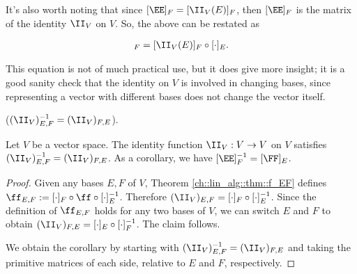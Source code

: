 \begin{theorem}
    It's also worth noting that since $[\EE]_F = [\II_V(E)]_F$, then $[\EE]_F$ is the matrix of the identity $\II_V$ on $V$. So, the above can be restated as
    
    \begin{align*}
        [\cdot]_F = [\II_V(E)]_F \circ [\cdot]_E.
    \end{align*}
    
    This equation is not of much practical use, but it does give more insight; it is a good sanity check that the identity on $V$ is involved in changing bases, since representing a vector with different bases does not change the vector itself.
\end{theorem}

\begin{theorem}
\label{ch::lin_alg::thm::I_EF}
    ($(\II_V)_{E,F}^{-1} = (\II_V)_{F,E}$).
    
    Let $V$ be a vector space. The identity function $\II_V:V \rightarrow V$ on $V$ satisfies $(\II_V)_{E,F}^{-1} = (\II_V)_{F,E}$. As a corollary, we have $[\EE]_F^{-1} = [\FF]_E$.
\end{theorem}

\begin{proof}
    Given any bases $E, F$ of $V$, Theorem \ref{ch::lin_alg::thm::f_EF} defines $\ff_{E,F} := [\cdot]_F \circ \ff \circ [\cdot]_E^{-1}$. Therefore $(\II_V)_{E,F} = [\cdot]_F \circ [\cdot]_E^{-1}$. Since the definition of $\ff_{E,F}$ holds for any two bases of $V$, we can switch $E$ and $F$ to obtain $(\II_V)_{F,E} = [\cdot]_E \circ [\cdot]_F^{-1}$. The claim follows.
    
    We obtain the corollary by starting with $(\II_V)_{E,F}^{-1} = (\II_V)_{F,E}$ and taking the primitive matrices of each side, relative to $E$ and $F$, respectively.
\end{proof}

